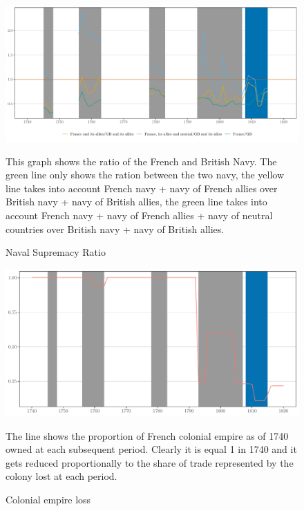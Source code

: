 \documentclass[12pt,a4paper,notitlepage,english]{article}
\newcommand{\fontsmall}{\fontsize{10pt}{12pt}\selectfont}
\begin{document}
\begin{appendix}
\begin{figure}[h!]
\caption{Naval Supremacy Ratio}
\label{naval_supremacy_ratios}
\centering
\includegraphics[scale=.18]{naval_supremacy_ratio}
\begin{minipage}{18cm}
\begin{flushleft}
\fontsmall 
This graph shows the ratio of the French and British Navy. The green line only shows the ration between the two navy, the yellow line takes into account French navy + navy of French allies over British navy + navy of British allies, the green line takes into account French navy + navy of French allies + navy of neutral countries over British navy + navy of British allies. 
\end{flushleft}
\end{minipage}
\end{figure}

\begin{figure}[h!]
\caption{Colonial empire loss}
\label{colony_loss}
\centering
\includegraphics[scale=.18]{colony_loss}
\begin{minipage}{18cm}
\begin{flushleft}
\fontsmall 
The line shows the proportion of French colonial empire as of 1740 owned at each subsequent period. Clearly it is equal 1 in 1740 and it gets reduced proportionally to the share of trade represented by the colony lost at each period.
\end{flushleft}
\end{minipage}
\end{figure}


\end{appendix}
\end{document}
